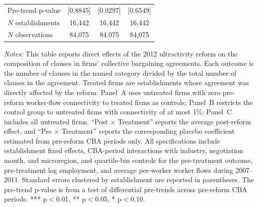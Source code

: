 \begin{table}[!htbp]
\begin{tabular}{lccc}
Pre-trend p-value & [0.8845] & [0.0297] & [0.6549]\\
$N$ establishments & 16{,}442 & 16{,}442 & 16{,}442\\
$N$ observations & 84{,}075 & 84{,}075 & 84{,}075\\
\bottomrule
\end{tabular}
\begin{minipage}{\linewidth}
\footnotesize\vspace{4pt}
\textit{Notes:} This table reports direct effects of the 2012 ultractivity reform on the composition of clauses in firms' collective bargaining agreements. Each outcome is the number of clauses in the named category divided by the total number of clauses in the agreement. Treated firms are establishments whose agreement was directly affected by the reform. Panel~A uses untreated firms with zero pre-reform worker-flow connectivity to treated firms as controls; Panel~B restricts the control group to untreated firms with connectivity of at most 1\%; Panel~C includes all untreated firms. ``Post $\times$ Treatment'' reports the average post-reform effect, and ``Pre $\times$ Treatment'' reports the corresponding placebo coefficient estimated from pre-reform CBA periods only. All specifications include establishment fixed effects, CBA-period interactions with industry, negotiation month, and microregion, and quartile-bin controls for the pre-treatment outcome, pre-treatment log employment, and average per-worker worker flows during 2007--2011. Standard errors clustered by establishment are reported in parentheses. The pre-trend p-value is from a test of differential pre-trends across pre-reform CBA periods. *** p$<$0.01, ** p$<$0.05, * p$<$0.10.
\end{minipage}
\end{table}
